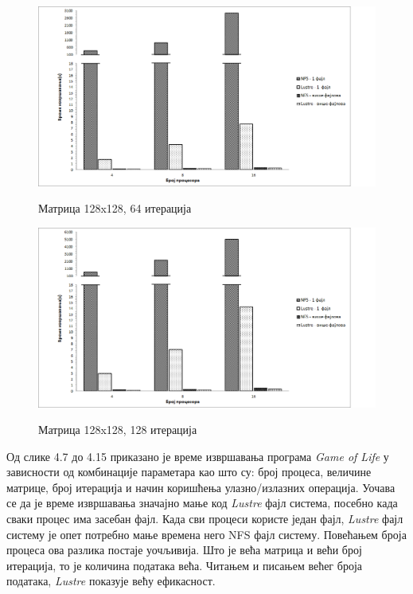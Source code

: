       \begin{figure}[H]
        \centering
            \includegraphics[width=1\textwidth]{slike/results/128_64.png}\\[1cm]
        \caption{Матрица 128x128, 64 итерација}
      \end{figure}
      
      \begin{figure}[H]
        \centering
            \includegraphics[width=1\textwidth]{slike/results/128_128.png}\\[1cm]
       \caption{Матрица 128x128, 128 итерација}
      \end{figure}
  
Од слике 4.7 до 4.15 приказано је време извршавања програма \textit{Game of Life} у зависности од комбинације параметара као што су: број процеса, величине матрице, број итерација и начин коришћења улазно/излазних операција. Уочава се да је време извршавања значајно мање код \textit{Lustre} фајл система, посебно када сваки процес има засебан фајл. Када сви процеси користе један фајл, \textit{Lustre} фајл систему је опет потребно мање времена него NFS фајл систему. Повећањем броја процеса ова разлика постаје уочљивија. 
Што је већа матрица и већи број итерација, то је количина података већа. Читањем и писањем већег броја података, \textit{Lustre} показује већу ефикасност. 
  
